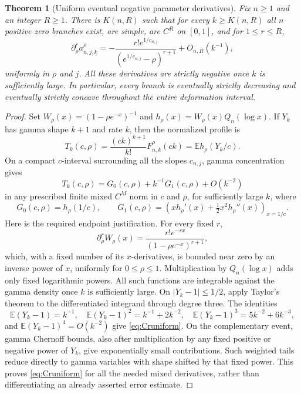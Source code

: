 \documentclass[11pt,letterpaper]{article}
\numberwithin{equation}{section}
\newtheorem{theorem}{Theorem}[section]
\theoremstyle{definition}\newtheorem{definition}[theorem]{Definition}
\theoremstyle{remark}\newtheorem{remark}[theorem]{Remark}
\newcommand{\E}{\mathbb E}\newcommand{\dd}{\,\mathrm d}
\newcommand{\F}[3]{F_{#1,#2}^{#3}}
\begin{document}
\begin{theorem}[Uniform eventual negative parameter derivatives]\label{thm:eventual}
Fix $n\ge1$ and an integer $R\ge1$. There is $K(n,R)$ such that for every $k\ge K(n,R)$ all $n$ positive zero branches exist, are simple, are $C^R$ on $[0,1]$, and for $1\le r\le R$,
\begin{equation}\label{eq:allnegative}
 \partial_\rho^r a_{n,j,k}^{\rho}
 =-\frac{r!e^{1/c_{n,j}}}{(e^{1/c_{n,j}}-\rho)^{r+1}}+O_{n,R}(k^{-1}),
\end{equation}
uniformly in $\rho$ and $j$. All these derivatives are strictly negative once $k$ is sufficiently large. In particular, every branch is eventually strictly decreasing and eventually strictly concave throughout the entire deformation interval.
\end{theorem}
\begin{proof}
Set $W_\rho(x)=(1-\rho e^{-x})^{-1}$ and $h_\rho(x)=W_\rho(x)Q_n(\log x)$. If $Y_k$ has gamma shape $k+1$ and rate $k$, then the normalized profile is
\begin{equation}\label{eq:gamma-profile}
 T_k(c,\rho)=\frac{(ck)^{k+1}}{k!}\F nk\rho(ck)
 =\E h_\rho(Y_k/c).
\end{equation}
On a compact $c$-interval surrounding all the slopes $c_{n,j}$, gamma concentration gives
\begin{equation}\label{eq:Cruniform}
 T_k(c,\rho)=G_0(c,\rho)+k^{-1}G_1(c,\rho)+O(k^{-2})
\end{equation}
in any prescribed finite mixed $C^M$ norm in $c$ and $\rho$, for sufficiently large $k$, where
\[
 G_0(c,\rho)=h_\rho(1/c),\qquad
 G_1(c,\rho)=\left(xh_\rho'(x)+\tfrac12x^2h_\rho''(x)\right)_{x=1/c}.
\]
Here is the required endpoint justification. For every fixed $r$,
\[
 \partial_\rho^rW_\rho(x)=\frac{r!e^{-rx}}{(1-\rho e^{-x})^{r+1}},
\]
which, with a fixed number of its $x$-derivatives, is bounded near zero by an inverse power of $x$, uniformly for $0\le\rho\le1$. Multiplication by $Q_n(\log x)$ adds only fixed logarithmic powers. All such functions are integrable against the gamma density once $k$ is sufficiently large. On $|Y_k-1|\le1/2$, apply Taylor's theorem to the differentiated integrand through degree three. The identities
\[
 \E(Y_k-1)=k^{-1},\quad
 \E(Y_k-1)^2=k^{-1}+2k^{-2},\quad
 \E(Y_k-1)^3=5k^{-2}+6k^{-3},
\]
and $\E(Y_k-1)^4=O(k^{-2})$ give \eqref{eq:Cruniform}. On the complementary event, gamma Chernoff bounds, also after multiplication by any fixed positive or negative power of $Y_k$, give exponentially small contributions. Such weighted tails reduce directly to gamma variables with shape shifted by that fixed power. This proves \eqref{eq:Cruniform} for all the needed mixed derivatives, rather than differentiating an already asserted error estimate.


\end{proof}
\end{document}
